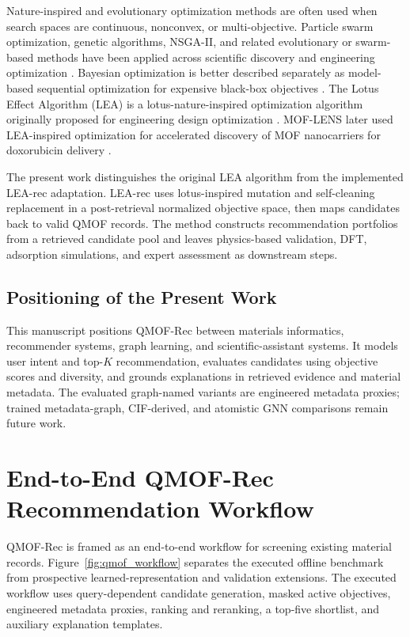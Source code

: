 \documentclass[12pt,a4paper]{article}
\begin{document}
Nature-inspired and evolutionary optimization methods are often used when search spaces are continuous, nonconvex, or multi-objective. Particle swarm optimization, genetic algorithms, NSGA-II, and related evolutionary or swarm-based methods have been applied across scientific discovery and engineering optimization \cite{deb2002}. Bayesian optimization is better described separately as model-based sequential optimization for expensive black-box objectives \cite{shahriari2016}. The Lotus Effect Algorithm (LEA) is a lotus-nature-inspired optimization algorithm originally proposed for engineering design optimization \cite{dalirinia2024}. MOF-LENS later used LEA-inspired optimization for accelerated discovery of MOF nanocarriers for doxorubicin delivery \cite{jalali2025lens}.

The present work distinguishes the original LEA algorithm from the implemented LEA-rec adaptation. LEA-rec uses lotus-inspired mutation and self-cleaning replacement in a post-retrieval normalized objective space, then maps candidates back to valid QMOF records. The method constructs recommendation portfolios from a retrieved candidate pool and leaves physics-based validation, DFT, adsorption simulations, and expert assessment as downstream steps.

\subsection{Positioning of the Present Work}

This manuscript positions QMOF-Rec between materials informatics, recommender systems, graph learning, and scientific-assistant systems. It models user intent and top-$K$ recommendation, evaluates candidates using objective scores and diversity, and grounds explanations in retrieved evidence and material metadata. The evaluated graph-named variants are engineered metadata proxies; trained metadata-graph, CIF-derived, and atomistic GNN comparisons remain future work.

\section{End-to-End QMOF-Rec Recommendation Workflow}
\label{sec:arch}

QMOF-Rec is framed as an end-to-end workflow for screening existing material records. Figure~\ref{fig:qmof_workflow} separates the executed offline benchmark from prospective learned-representation and validation extensions. The executed workflow uses query-dependent candidate generation, masked active objectives, engineered metadata proxies, ranking and reranking, a top-five shortlist, and auxiliary explanation templates.
\end{document}
